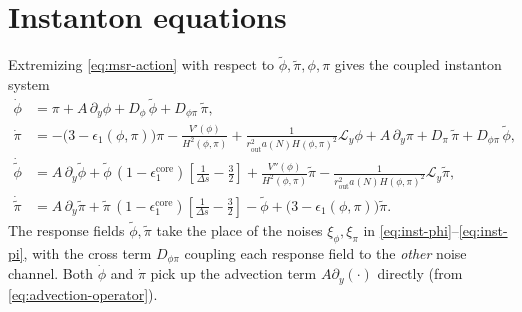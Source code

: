 \documentclass[a4paper,11pt]{article}
\newcommand{\Ny}{N}                          %
\newcommand{\epsSR}{\epsilon_1}              %
\newcommand{\Hub}{H}                         %
\newcommand{\sfactor}{a}                     %
\newcommand{\atloc}{(\field,\mom)}           %
\newcommand{\field}{\phi}                    %
\newcommand{\mom}{\pi}                       %
\newcommand{\Vpot}{V}                        %
\newcommand{\noise}[1]{\xi_{#1}}             %
\newcommand{\rfield}{\widetilde\field}       %
\newcommand{\rmom}{\widetilde\mom}           %
\newcommand{\rad}{r}                         %
\newcommand{\yco}{y}                         %
\newcommand{\rout}{\rad_{\mathrm{out}}}      %
\newcommand{\aHloc}{\sfactor(\Ny)\Hub\atloc} %
\newcommand{\Deltas}{\Delta s}                %
\newcommand{\epscore}{\epsSR^{\mathrm{core}}} %
\newcommand{\advcoef}{A}                     %
\newcommand{\Lop}{\mathcal{L}_\yco}          %
\newcommand{\Dnoise}[1]{D_{#1}}              %
\begin{document}
\section{Instanton equations}
\label{sec:instanton-eqs}

Extremizing \eqref{eq:msr-action} with respect to $\rfield,\rmom,\field,\mom$
gives the coupled instanton system
\begin{subequations}
\label{eq:instanton-eqs}
\begin{align}
    \dot\field
    & =
    \mom + \advcoef\,\partial_\yco\field + \Dnoise{\field}\,\rfield + \Dnoise{\field\mom}\,\rmom ,
    \label{eq:inst-phi}
    \\
    \dot\mom
    & =
    -\big(3-\epsSR\atloc\big)\mom - \frac{\Vpot'(\field)}{\Hub^2\atloc}
    + \frac{1}{\rout^2\aHloc^2}\Lop\field
    + \advcoef\,\partial_\yco\mom
    + \Dnoise{\mom}\,\rmom + \Dnoise{\field\mom}\,\rfield ,
    \label{eq:inst-pi}
    \\
    \dot{\rfield}
    & =
    \advcoef\,\partial_\yco\rfield
    + \rfield\,(1-\epscore)\left[\frac{1}{\Deltas}-\frac32\right]
    + \frac{\Vpot''(\field)}{\Hub^2\atloc}\rmom
    - \frac{1}{\rout^2\aHloc^2}\Lop\rmom ,
    \label{eq:inst-rphi}
    \\
    \dot{\rmom}
    & =
    \advcoef\,\partial_\yco\rmom
    + \rmom\,(1-\epscore)\left[\frac{1}{\Deltas}-\frac32\right]
    - \rfield + \big(3-\epsSR\atloc\big)\rmom .
    \label{eq:inst-rpi}
\end{align}
\end{subequations}
The response fields $\rfield,\rmom$ take the place of the noises
$\noise{\field}, \noise{\mom}$ in \eqref{eq:inst-phi}--\eqref{eq:inst-pi},
with the cross term $\Dnoise{\field\mom}$ coupling each
response field to the \emph{other} noise channel. Both
$\dot\field$ and $\dot\mom$ pick up the
advection term $\advcoef\partial_\yco(\cdot)$ directly (from
\eqref{eq:advection-operator}).
\end{document}
